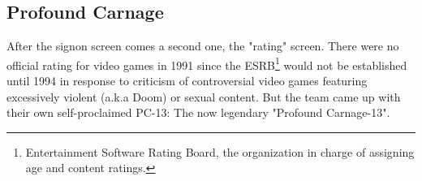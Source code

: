 \documentclass[book.tex]{subfiles}
\begin{document}
\subsection{Profound Carnage}
After the signon screen comes a second one, the "rating" screen. There were no official rating for video games in 1991 since the ESRB\footnote{Entertainment Software Rating Board, the organization in charge of assigning age and content ratings.} would not be established until 1994 in response to criticism of controversial video games featuring excessively violent (a.k.a Doom) or sexual content. But the team came up with their own self-proclaimed PC-13: The now legendary "Profound Carnage-13".\\
\begin{figure}[H]
\centering
{}
\end{figure}
\end{document}
